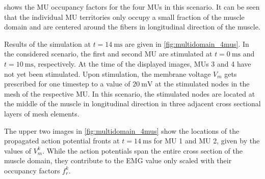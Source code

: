 shows the MU occupancy factors for the four MUs in this scenario. It can be seen that the individual MU territories only occupy a small fraction of the muscle domain and are centered around the fibers in longitudinal direction of the muscle.

Results of the simulation at $t=\SI{14}{\ms}$ are given in \cref{fig:multidomain_4mus}. In the considered scenario, the first and second MU are stimulated at $t=\SI{0}{\ms}$ and $t=\SI{10}{\ms}$, respectively. At the time of the displayed images, MUs 3 and 4 have not yet been stimulated. 
Upon stimulation, the membrane voltage $V_m$ gets prescribed for one timestep to a value of $\SI{20}{\milli\volt}$ at the stimulated nodes in the mesh of the respective MU. In this scenario, the stimulated nodes are located at the middle of the muscle in longitudinal direction in three adjacent cross sectional layers of mesh elements.

The upper two images in \cref{fig:multidomain_4mus} show the locations of the propagated action potential fronts at $t=\SI{14}{\ms}$ for MU 1 and MU 2, given by the values of $V_m^k$. While the action potentials span the entire cross section of the muscle domain, they contribute to the EMG value only scaled with their occupancy factors $f_r^k$.

